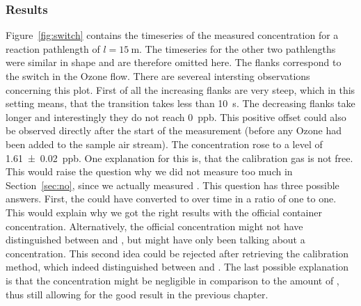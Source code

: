 \subsubsection{Results}
\label{sec:switch-results}

Figure~\ref{fig:switch} contains the timeseries of the measured
 concentration for a reaction pathlength of $l =
\SI{15}{\meter}$. The timeseries for the other two pathlengths were
similar in shape and are therefore omitted here. The flanks correspond
to the switch in the Ozone flow. There are severeal intersting
observations concerning this plot. First of all the increasing flanks
are very steep, which in this setting means, that the transition takes
less than \SI{10}{\second}. The decreasing flanks take longer and
interestingly they do not reach \SI{0}{ppb}. This positive offset
could also be observed directly after the start of the measurement
(before any Ozone had been added to the 
sample air stream). The concentration rose to a level of
\SI{1.61(2)}{ppb}. One explanation for this is, that the calibration gas is
not  free. This would raise the question why we did not
measure too much  in Section~\ref{sec:no}, since we actually
measured . This question has three possible answers. First, the
 could have converted to  over time in a ratio of
one to one. This would explain why we got the right results with the official
container concentration. Alternatively, the official concentration
might not have distinguished between  and , but might
have only been talking about a  concentration. This second
idea could be rejected after retrieving the calibration method, which
indeed distinguished between  and . The last possible
explanation is that the  concentration might be negligible in
comparison to the amount of , thus still allowing for the good
result in the previous chapter.

